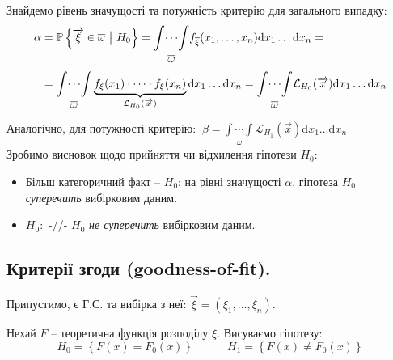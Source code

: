 Знайдемо рівень значущості та потужність критерію для загального випадку:
\[
\begin{split}
\alpha &= \mathbb{P} \left\lbrace  \overrightarrow{\xi} \in \overline{\omega} \ \big| \  H_0 \right\rbrace =
\underset{\begin{gathered}
 \overline{\omega}
\end{gathered}}{ \int\!\cdots\!\int }  f_{\overline{\xi} }(x_1, \dots, x_n) \mathrm{d} x_1 \dots \mathrm{d} x_n =
\\ &=
\underset{\begin{gathered}
 \overline{\omega}
\end{gathered}}{ \int\!\cdots\!\int }   \underbrace{f_{\xi}(x_1) \cdot \dots \cdot f_{\xi}(x_n)}_{\mathcal{L}_{H_0}(\overrightarrow{x})}\mathrm{d} x_1 \dots \mathrm{d} x_n =
\underset{\begin{gathered}
 \overline{\omega}
\end{gathered}}{\int\!\cdots\!\int}
\mathcal{L}_{H_0}(\overrightarrow{x})
\mathrm{d} x_1 \dots \mathrm{d} x_n
\end{split}
\]
Аналогічно, для потужності критерію:
\(
\
\displaystyle
\beta = \underset{\begin{gathered}
 \omega
\end{gathered}}{\int\!\cdots\!\int}
\mathcal{L}_{H_1}(\overrightarrow{x})
\mathrm{d} x_1 \dots \mathrm{d} x_n
\)\\
Зробимо висновок щодо прийняття чи відхилення гіпотези $H_0$:
\begin{itemize}
  \item Більш категоричний факт --  $H_0$: на рівні значущості $\alpha$, гіпотеза $H_0$ \textit{суперечить} вибірковим даним.
  \item \blue{Прийняття} $H_0$:\  -//- $H_0$ \textit{не суперечить} вибірковим даним.
\end{itemize}
\subsection{Критерії згоди (goodness-of-fit).}
Припустимо, є Г.С. та вибірка з неї: $\overrightarrow{ \xi} = (\xi_1, \dots, \xi_n)$. \par
Нехай $F$ -- теоретична функція розподілу $\xi$. Висуваємо гіпотезу:
$$
H_0 = \left\lbrace F(x) = F_0(x) \right\rbrace \qquad \quad H_1 = \left\lbrace F(x) \neq  F_0(x) \right\rbrace
$$
